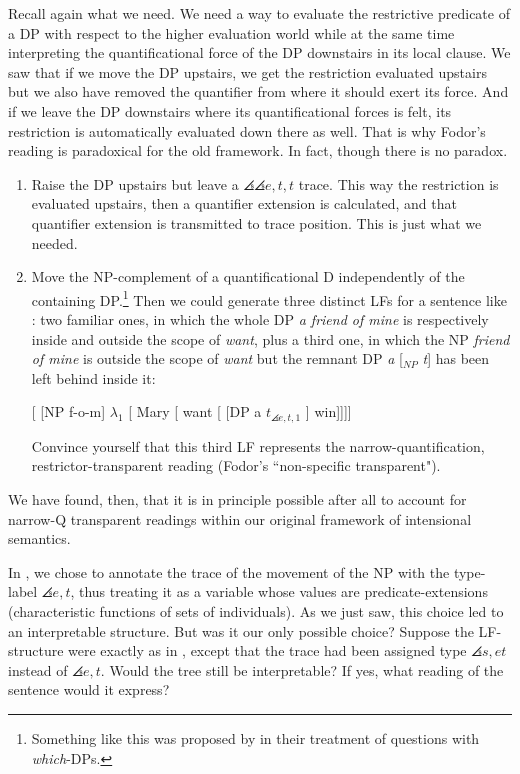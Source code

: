 Recall again what we need. We need a way to evaluate the restrictive predicate of a DP with respect to the higher evaluation world while at the same time interpreting the quantificational force of the DP downstairs in its local clause. We saw that if we move the DP upstairs, we get the restriction evaluated upstairs but we also have removed the quantifier from where it should exert its force. And if we leave the DP downstairs where its quantificational forces is felt, its restriction is automatically evaluated down there as well. That is why Fodor's reading is paradoxical for the old framework. In fact, though there is no paradox.

\begin{enumerate}[{Way} 1]
  
  \item Raise the DP upstairs but leave a $\angles{\angles{e,t},t}$ trace. This way the restriction is evaluated upstairs, then a quantifier extension is calculated, and that quantifier extension is transmitted to trace position. This is just what we needed.
  
  \item Move the NP-complement of a quantificational D independently of the containing DP.\footnote{Something like this was proposed by \citet{groenendijk-stokhof:L&P:82} in their treatment of questions with \emph{which}-DPs.} Then we could generate three distinct LFs for a sentence like : two familiar ones, in which the whole DP \emph{a friend of mine} is respectively inside and outside the scope of \emph{want}, plus a third one, in which the NP \emph{friend of mine} is outside the scope of \emph{want} but the remnant DP \emph{a} [$_{NP}$ \emph{t}] has been left behind inside it:
  
  \ex \label{138} [ [NP f-o-m] $\lambda_1$ [ Mary [ want [ [DP a
  $t_{\angles{e,t},1}$ ] win]]]] \xe
  
  \begin{exercise}
      Convince yourself that this third LF represents the narrow-quantification, restrictor-transparent reading (Fodor's ``non-specific transparent"). \eex 
  \end{exercise}
\end{enumerate}
%
We have found, then, that it is in principle possible after all to account for narrow-Q transparent readings within our original framework of intensional semantics.

\begin{exercise}
  In , we chose to annotate the trace of the movement of the NP with the type-label $\angles{e,t}$, thus treating it as a variable whose values are predicate-extensions (characteristic functions of sets of individuals). As we just saw, this choice led to an interpretable structure. But was it our only possible choice? Suppose the LF-structure were exactly as in , except that the trace had been assigned type $\angles{s,et}$ instead of $\angles{e,t}$. Would the tree still be interpretable? If yes, what reading of the sentence would it express? \eex 
\end{exercise}

